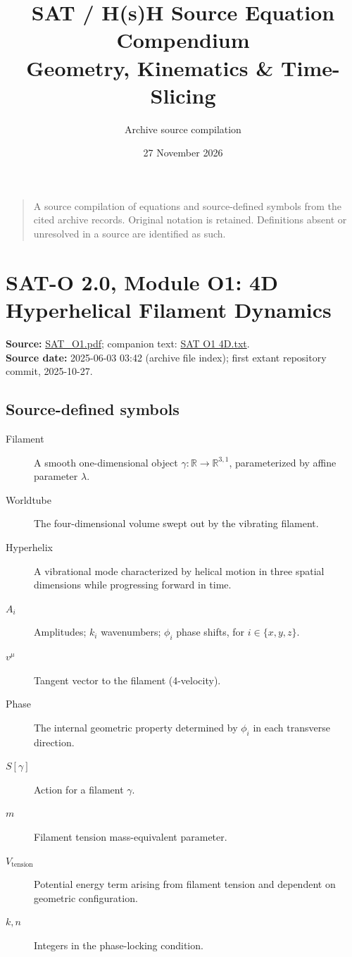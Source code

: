 \documentclass[10pt]{article}
\title{SAT / H(s)H Source Equation Compendium\\[0.35em]\large Geometry, Kinematics \& Time-Slicing}
\author{Archive source compilation}
\date{27 November 2026}
\begin{document}
\maketitle
\thispagestyle{empty}
\vspace{1em}
\begin{quote}\small
A source compilation of equations and source-defined symbols from the cited archive records. Original notation is retained. Definitions absent or unresolved in a source are identified as such.
\end{quote}
\tableofcontents
\newpage

\section{SAT-O 2.0, Module O1: 4D Hyperhelical Filament Dynamics}
\textbf{Source:} \href{https://github.com/Satobloc/SAT_THEORY_ARCHIVE_2023-25/blob/main/SAT_O1.pdf}{SAT\_O1.pdf}; companion text: \href{https://github.com/Satobloc/SAT_THEORY_ARCHIVE_2023-25/blob/main/SATOBLOC/SAT%20O1%204D.txt}{SAT O1 4D.txt}.\\
\textbf{Source date:} 2025-06-03 03:42 (archive file index); first extant repository commit, 2025-10-27.

\subsection*{Source-defined symbols}
\begin{description}
\item[Filament] A smooth one-dimensional object $\gamma:\mathbb R\to\mathbb R^{3,1}$, parameterized by affine parameter $\lambda$.
\item[Worldtube] The four-dimensional volume swept out by the vibrating filament.
\item[Hyperhelix] A vibrational mode characterized by helical motion in three spatial dimensions while progressing forward in time.
\item[$A_i$] Amplitudes; $k_i$ wavenumbers; $\phi_i$ phase shifts, for $i\in\{x,y,z\}$.
\item[$v^\mu$] Tangent vector to the filament (4-velocity).
\item[Phase] The internal geometric property determined by $\phi_i$ in each transverse direction.
\item[{\(S[\gamma]\)}] Action for a filament $\gamma$.
\item[$m$] Filament tension mass-equivalent parameter.
\item[$V_{\text{tension}}$] Potential energy term arising from filament tension and dependent on geometric configuration.
\item[$k,n$] Integers in the phase-locking condition.
\end{description}
\end{document}
